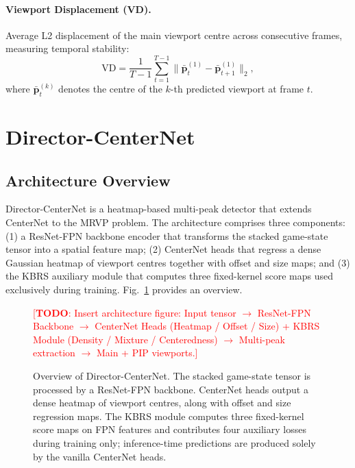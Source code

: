 \documentclass[preprint,12pt]{elsarticle}
\newcommand{\todo}[1]{\textcolor{red}{[\textbf{TODO}: #1]}}
\begin{document}
\paragraph{Viewport Displacement (VD).}
Average L2 displacement of the main viewport centre across consecutive 
frames, measuring temporal stability:
\begin{equation}
  \text{VD} = \frac{1}{T-1}\sum_{t=1}^{T-1}
    \bigl\|\bar{\mathbf{p}}^{(1)}_t - \bar{\mathbf{p}}^{(1)}_{t+1}\bigr\|_2,
  \label{eq:vd}
\end{equation}
where $\bar{\mathbf{p}}^{(k)}_t$ denotes the centre of the $k$-th predicted 
viewport at frame $t$.

\section{Director-CenterNet}
\label{sec:method}

\subsection{Architecture Overview}

Director-CenterNet is a heatmap-based multi-peak detector that extends 
CenterNet \cite{zhou2019objects} to the MRVP problem. The architecture 
comprises three components: (1) a ResNet-FPN backbone encoder that transforms 
the stacked game-state tensor into a spatial feature map; (2) CenterNet heads 
that regress a dense Gaussian heatmap of viewport centres together with offset 
and size maps; and (3) the KBRS auxiliary module that computes three 
fixed-kernel score maps used exclusively during training. 
Fig.~\ref{fig:architecture} provides an overview.

\begin{figure}[t]
  \centering
  \todo{Insert architecture figure: Input tensor $\rightarrow$ ResNet-FPN 
  Backbone $\rightarrow$ CenterNet Heads (Heatmap / Offset / Size) + KBRS 
  Module (Density / Mixture / Centeredness) $\rightarrow$ Multi-peak 
  extraction $\rightarrow$ Main + PIP viewports.}
  \caption{Overview of Director-CenterNet. The stacked game-state tensor is 
  processed by a ResNet-FPN backbone. CenterNet heads output a dense heatmap 
  of viewport centres, along with offset and size regression maps. The KBRS 
  module computes three fixed-kernel score maps on FPN features and 
  contributes four auxiliary losses during training only; inference-time 
  predictions are produced solely by the vanilla CenterNet heads.}
  \label{fig:architecture}
\end{figure}
\end{document}
